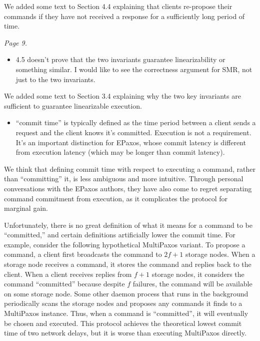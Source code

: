 \documentclass[letterpaper,twocolumn,10pt]{article}
\newenvironment{reviewerquote}
{\list{}{\leftmargin=\parindent\rightmargin=0in}\item[] \itshape \color{ReviewerDarkGray}}%
{\endlist}
\begin{document}
We added some text to Section 4.4 explaining that clients re-propose their
commands if they have not received a response for a sufficiently long period of
time.

\begin{reviewerquote}
  Page 9.

  \begin{itemize}
    \item
      4.5 doesn't prove that the two invariants guarantee linearizability or
      something similar. I would like to see the correctness argument for SMR,
      not just to the two invariants.
  \end{itemize}
\end{reviewerquote}

We added some text to Section 3.4 explaining why the two key invariants are
sufficient to guarantee linearizable execution.

\begin{reviewerquote}
  \begin{itemize}
    \item
      ``commit time'' is typically defined as the time period between a client
      sends a request and the client knows it's committed. Execution is not a
      requirement. It's an important distinction for EPaxos, whose commit
      latency is different from execution latency (which may be longer than
      commit latency).
  \end{itemize}
\end{reviewerquote}

We think that defining commit time with respect to executing a command, rather
than ``committing'' it, is less ambiguous and more intuitive. Through personal
conversations with the EPaxos authors, they have also come to regret separating
command commitment from execution, as it complicates the protocol for marginal
gain.

Unfortunately, there is no great definition of what it means for a command to
be ``committed,'' and certain definitions artificially lower the commit time.
%
For example, consider the following hypothetical MultiPaxos variant. To propose
a command, a client first broadcasts the command to $2f+1$ storage nodes. When
a storage node receives a command, it stores the command and replies back to
the client. When a client receives replies from $f+1$ storage nodes, it
considers the command ``committed'' because despite $f$ failures, the command
will be available on some storage node. Some other daemon process that runs in
the background periodically scans the storage nodes and proposes any commands
it finds to a MultiPaxos instance. Thus, when a command is ``committed'', it
will eventually be chosen and executed. This protocol achieves the theoretical
lowest commit time of two network delays, but it is worse than executing
MultiPaxos directly.
\end{document}
